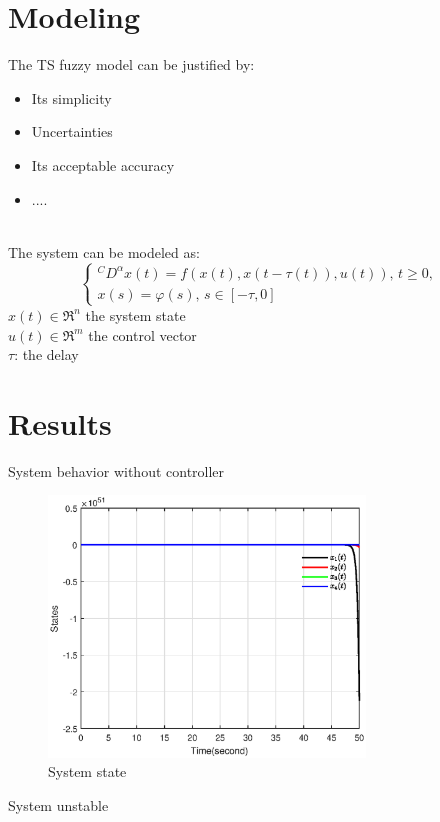 \documentclass[dvipsnames,mathserif]{beamer}
\begin{document}
{    \begin{frame}

    \end{frame}


    \section{Modeling}
    \begin{frame}
      \footnotesize
      The TS fuzzy model can be justified by:
      \begin{itemize}
        \item Its simplicity
        \item Uncertainties
        \item Its acceptable accuracy
        \item ....
      \end{itemize}
      \pause
      \quad \\
      The system can be modeled as:
      \begin{equation*}
        \left\{\begin{array}{l}
            { }^C D^\alpha x(t)=f(x(t),x(t-\tau(t)),u(t)),\, t \geq 0, \\
            x(s)=\varphi(s),\, s \in[-\tau, 0]
        \end{array}\right.
      \end{equation*}
      $x(t) \in \Re ^{n}$ the system state\\
      $u(t) \in \Re ^{m}$ the control vector \\
      $\tau$: the delay
    \end{frame}

    \section{Results}

    \begin{frame}
      \footnotesize
      System behavior without controller
      \begin{figure}[H]
        \centering
        \includegraphics[width=0.75\textwidth]{x_1.eps}
        \caption{System state}
      \end{figure}
      System unstable
    \end{frame}

}
\end{document}
